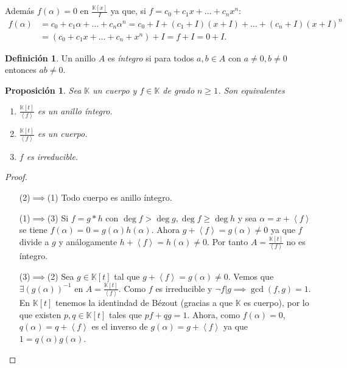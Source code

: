 \documentclass[10pt, spanish]{report}
\newtheorem*{prop}{Proposición}
\theoremstyle{definition}
\newtheorem*{defin}{Definición}
\newcommand{\K}{\mathbb{K}}
\renewcommand{\geq}{\geqslant}
\newcommand{\fecha}[1]{\marginpar{\underline{#1}}}
\begin{document}
Además $f(\alpha)=0$ en $\frac{\K[x]}{I}$ ya que, si $f=c_0+c_1x+\ldots+c_nx^n$:
\begin{equation*}
    \begin{split}
        f(\alpha) &=c_0+c_1\alpha+\ldots+c_n\alpha^n
              =c_0+I+(c_1+I)(x+I)+\ldots+(c_n+I)(x+I)^n \\
                  &=(c_0+c_1x+\ldots+c_n+x^n)+I=f+I=0+I.
    \end{split}
\end{equation*}

\fecha{17/02}
\begin{defin}
    Un anillo $A$ es \textit{íntegro} si para todos $a,b\in A$ con $a\neq 0, b
    \neq 0$ entonces $ab\neq 0$.
\end{defin}

\newpage
\begin{prop}
    Sea $\K$ un cuerpo y $f\in \K$ de grado $n\geq1$. Son equivalentes
    \begin{enumerate}
        \item $\frac{\K[t]}{\left< f \right>}$ es un anillo íntegro.
        \item $\frac{\K[t]}{\left< f\right>}$ es un cuerpo.
        \item $f$ es irreducible.
    \end{enumerate}
\end{prop}

\begin{proof}\hspace{1em}
    \begin{itemize}[itemindent=36pt]
        \item[(2)$\implies$(1)] Todo cuerpo es anillo íntegro.
        \item[(1)$\implies$(3)] Si $f=g*h$ con $\deg{f}>\deg{g},\deg{f}\geq
            \deg{h}$ y sea $\alpha = x+\left< f \right> $ se tiene $f(\alpha)=0
            =g(\alpha)h(\alpha)$. Ahora $g+\left< f \right> = g(\alpha) \neq 0$
            ya que $f$ divide a $g$ y análogamente $h+\left< f \right> =
            h(\alpha)\neq 0$.
            Por tanto $A=\frac{\K[t]}{\left< f \right> }$ no es íntegro.
        \item[(3)$\implies$(2)] Sea $g\in \K[t]$  tal que $g+\left< f \right>
            =g(\alpha)\neq 0$. Vemos que $\exists(g(\alpha))^{-1}$ en
            $A=\frac{\K[t]}{\left< f \right> }$. Como $f$ es irreducible y
            $\neg f|g \implies \gcd(f,g)=1$. En $\K[t]$ tenemos la identindad de
            Bézout (gracias a que $\K$ es cuerpo), por lo que existen $p,q\in
            \K[t]$ tales que $pf+qg=1$.
            Ahora, como $f(\alpha)=0$, $q(\alpha)=q+\left< f \right>$  es el
            inverso de $g(\alpha)=g+\left< f \right>$ ya que $1=q(\alpha)
            g(\alpha)$.
    \end{itemize}
    \vspace{-1em}
\end{proof}
\end{document}
